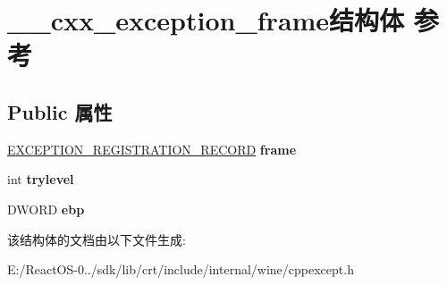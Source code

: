 \hypertarget{struct____cxx__exception__frame}{}\section{\+\_\+\+\_\+cxx\+\_\+exception\+\_\+frame结构体 参考}
\label{struct____cxx__exception__frame}
\subsection*{Public 属性}
\begin{DoxyCompactItemize}
\item 
\mbox{\label{struct____cxx__exception__frame_a1710aaff61162bfcaaf3884f3dfeb9e1}} 
\hyperlink{struct___e_x_c_e_p_t_i_o_n___r_e_g_i_s_t_r_a_t_i_o_n___r_e_c_o_r_d}{E\+X\+C\+E\+P\+T\+I\+O\+N\+\_\+\+R\+E\+G\+I\+S\+T\+R\+A\+T\+I\+O\+N\+\_\+\+R\+E\+C\+O\+RD} {\bfseries frame}
\item 
\mbox{\label{struct____cxx__exception__frame_aa83b865fdb8764d4c6a668db736f7211}} 
int {\bfseries trylevel}
\item 
\mbox{\label{struct____cxx__exception__frame_ae90c582f15fa6ab963a9df9bf806820b}} 
D\+W\+O\+RD {\bfseries ebp}
\end{DoxyCompactItemize}


该结构体的文档由以下文件生成\+:\begin{DoxyCompactItemize}
\item 
E\+:/\+React\+O\+S-\/0../sdk/lib/crt/include/internal/wine/cppexcept.\+h\end{DoxyCompactItemize}
